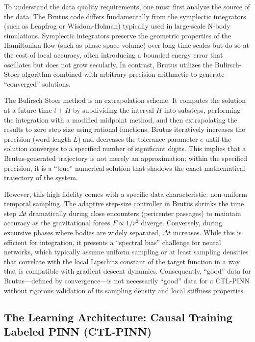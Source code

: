 To understand the data quality requirements, one must first analyze the source of the data. The Brutus code differs fundamentally from the symplectic integrators (such as Leapfrog or Wisdom-Holman) typically used in large-scale N-body simulations. Symplectic integrators preserve the geometric properties of the Hamiltonian flow (such as phase space volume) over long time scales but do so at the cost of local accuracy, often introducing a bounded energy error that oscillates but does not grow secularly. In contrast, Brutus utilizes the Bulirsch-Stoer algorithm combined with arbitrary-precision arithmetic to generate ``converged'' solutions.

The Bulirsch-Stoer method is an extrapolation scheme. It computes the solution at a future time $t + H$ by subdividing the interval $H$ into substeps, performing the integration with a modified midpoint method, and then extrapolating the results to zero step size using rational functions. Brutus iteratively increases the precision (word length $L$) and decreases the tolerance parameter $\epsilon$ until the solution converges to a specified number of significant digits. This implies that a Brutus-generated trajectory is not merely an approximation; within the specified precision, it is a ``true'' numerical solution that shadows the exact mathematical trajectory of the system.

However, this high fidelity comes with a specific data characteristic: non-uniform temporal sampling. The adaptive step-size controller in Brutus shrinks the time step $\Delta t$ dramatically during close encounters (pericenter passages) to maintain accuracy as the gravitational forces $F \propto 1/r^2$ diverge. Conversely, during excursive phases where bodies are widely separated, $\Delta t$ increases. While this is efficient for integration, it presents a ``spectral bias'' challenge for neural networks, which typically assume uniform sampling or at least sampling densities that correlate with the local Lipschitz constant of the target function in a way that is compatible with gradient descent dynamics. Consequently, ``good'' data for Brutus—defined by convergence—is not necessarily ``good'' data for a CTL-PINN without rigorous validation of its sampling density and local stiffness properties.

\subsection{The Learning Architecture: Causal Training Labeled PINN (CTL-PINN)}

